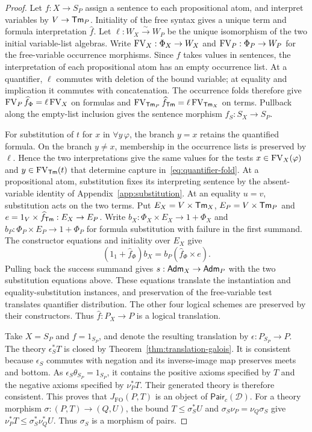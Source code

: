 \begin{proof}
Let $f:X\to S_P$ assign a sentence to each propositional atom, and
interpret variables by $V\to\mathsf{Tm}_P$. Initiality of the free syntax
gives a unique term and formula interpretation $\widehat f$.
Let $\ell:W_X\xrightarrow{\sim}W_P$ be the unique isomorphism
of the two initial variable-list algebras. Write
$\operatorname{FV}_X:\Phi_X\to W_X$ and $\operatorname{FV}_P:\Phi_P\to W_P$ for the
free-variable occurrence morphisms. Since $f$ takes values in
sentences, the interpretation of each propositional atom has an empty
occurrence list.
At a quantifier, $\ell$ commutes with deletion of the bound variable;
at equality and implication it commutes with concatenation.
The occurrence folds therefore give
$\operatorname{FV}_P\widehat f_\Phi=\ell\operatorname{FV}_X$ on formulas and
$\operatorname{FV}_{\mathsf{Tm}_P}\widehat f_{\mathsf{Tm}}=\ell\operatorname{FV}_{\mathsf{Tm}_X}$ on terms.
Pullback along the empty-list inclusion gives the sentence morphism $\widehat f_S:S_X\to S_P$.

For substitution of $t$ for $x$ in $\forall y\,\varphi$, the branch
$y=x$ retains the quantified formula. On the branch $y\ne x$,
membership in the occurrence lists is preserved by $\ell$.
Hence the two interpretations give the same values for the tests
$x\in\operatorname{FV}_X(\varphi)$ and $y\in\operatorname{FV}_{\mathsf{Tm}}(t)$ that determine
capture in~\eqref{eq:quantifier-fold}. At a propositional atom,
substitution fixes its interpreting sentence by the absent-variable
identity of Appendix~\ref{app:substitution}. At an equality $u=v$,
substitution acts on the two terms. Put $E_X=V\times\mathsf{Tm}_X$,
$E_P=V\times\mathsf{Tm}_P$ and $e=1_V\times\widehat f_{\mathsf{Tm}}:E_X\to E_P$.
Write $b_X:\Phi_X\times E_X\to 1+\Phi_X$ and
$b_P:\Phi_P\times E_P\to 1+\Phi_P$ for formula substitution with
failure in the first summand. The constructor equations and initiality
over $E_X$ give
\[
 (1_1+\widehat f_\Phi)b_X=b_P(\widehat f_\Phi\times e).
\]
Pulling back the success summand gives $s:\mathsf{Adm}_X\to\mathsf{Adm}_P$ with
the two substitution equations above. These equations translate the
instantiation and equality-substitution instances, and preservation
of the free-variable test translates quantifier distribution.
The other four logical schemes are preserved by their constructors.
Thus $\widehat f:P_X\to P$ is a logical translation.

Take $X=S_P$ and $f=1_{S_P}$, and denote the resulting translation
by $\epsilon:P_{S_P}\to P$. The theory $\epsilon_S^*T$ is closed by
Theorem~\ref{thm:translation-galois}. It is consistent because
$\epsilon_S$ commutes with negation and its inverse-image map preserves
meets and bottom. As $\epsilon_S\theta_{S_P}=1_{S_P}$, it contains
the positive axioms specified by $T$ and the negative axioms specified
by $\nu_P^*T$. Their generated theory is therefore consistent.
This proves that $J_{\mathrm{FO}}(P,T)$ is an object of
$\mathsf{Pair}_c(\mathcal D)$. For a theory morphism
$\sigma:(P,T)\to(Q,U)$, the bound $T\leq\sigma_S^*U$ and
$\sigma_S\nu_P=\nu_Q\sigma_S$ give
$\nu_P^*T\leq\sigma_S^*\nu_Q^*U$. Thus $\sigma_S$ is a morphism of pairs.


\end{proof}
